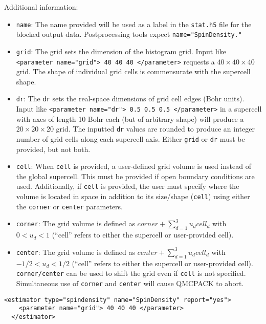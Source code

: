 Additional information:
\begin{itemize}
  \item{\texttt{name}: The name provided will be used as a label in the \texttt{stat.h5} file for the blocked output data.  Postprocessing tools expect \texttt{name="SpinDensity."}}
  \item{\texttt{grid}: The grid sets the dimension of the histogram grid.  Input like \texttt{<parameter name="grid"> 40 40 40 </parameter>} requests a $40 \times 40\times 40$ grid.  The shape of individual grid cells is commensurate with the supercell shape.}
  \item{\texttt{dr}: The {\texttt{dr}} sets the real-space dimensions of grid cell edges (Bohr units).  Input like \texttt{<parameter name="dr"> 0.5 0.5 0.5 </parameter>} in a supercell with axes of length 10 Bohr each (but of arbitrary shape) will produce a $20\times 20\times 20$ grid. The inputted \texttt{dr} values are rounded to produce an integer number of grid cells along each supercell axis.  Either \texttt{grid} or \texttt{dr} must be provided, but not both.}
  \item{\texttt{cell}: When \texttt{cell} is provided, a user-defined grid volume is used instead of the global supercell.  This must be provided if open boundary conditions are used.  Additionally, if \texttt{cell} is provided, the user must specify where the volume is located in space in addition to its size/shape (\texttt{cell}) using either the \texttt{corner} or \texttt{center} parameters.}
  \item{\texttt{corner}: The grid volume is defined as $corner+\sum_{d=1}^3u_dcell_d$ with $0<u_d<1$ (``cell'' refers to either the supercell or user-provided cell).}
  \item{\texttt{center}: The grid volume is defined as $center+\sum_{d=1}^3u_dcell_d$ with $-1/2<u_d<1/2$ (``cell'' refers to either the supercell or user-provided cell).  \texttt{corner/center} can be used to shift the grid even if \texttt{cell} is not specified.  Simultaneous use of \texttt{corner} and \texttt{center} will cause QMCPACK to abort.}
\end{itemize}

\begin{lstlisting}[style=QMCPXML,caption=Spin density estimator (uniform grid).]
  <estimator type="spindensity" name="SpinDensity" report="yes">
    <parameter name="grid"> 40 40 40 </parameter>
  </estimator>
\end{lstlisting}

